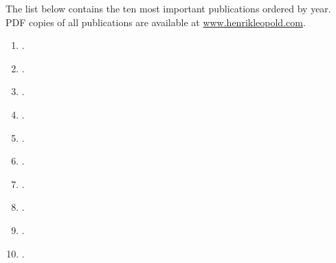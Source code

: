 

The list below contains the ten most important publications ordered by year. PDF copies of all publications are available at \href{http://www.henrikleopold.com}{www.henrikleopold.com}.


\begin{enumerate}
\item {}.
\item {}.
\item {}.
\item {}.
\item {}.
\item {}.
\item {}.
\item {}.
\item {}.
\item {}.
\end{enumerate}

